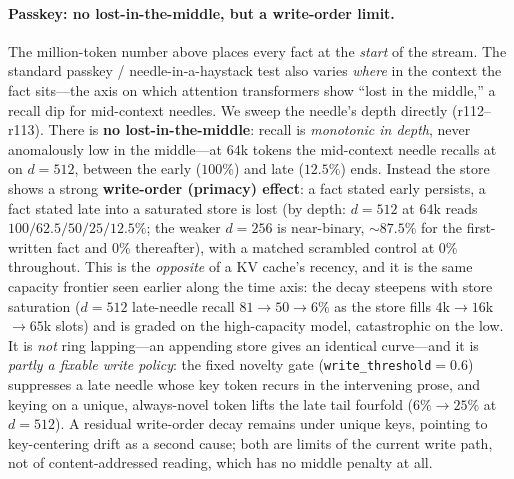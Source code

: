 \paragraph{Passkey: no lost-in-the-middle, but a write-order limit.} The million-token
number above places every fact at the \emph{start} of the stream. The standard passkey /
needle-in-a-haystack test also varies \emph{where} in the context the fact sits---the axis
on which attention transformers show ``lost in the middle,'' a recall dip for
mid-context needles. We sweep the needle's depth directly (r112--r113). There is
\textbf{no lost-in-the-middle}: recall is \emph{monotonic in depth}, never anomalously low
in the middle---at $64$k tokens the mid-context needle recalls at  on
$d{=}512$, between the early ($100\%$) and late ($12.5\%$) ends. Instead the store shows a
strong \textbf{write-order (primacy) effect}: a fact stated early persists, a fact stated
late into a saturated store is lost (by depth: $d{=}512$ at $64$k reads
$100/62.5/50/25/12.5\%$; the weaker $d{=}256$ is near-binary, $\sim\!87.5\%$ for the
first-written fact and $0\%$ thereafter), with a matched scrambled control at $0\%$
throughout. This is the \emph{opposite} of a KV cache's recency, and it is the same
capacity frontier seen earlier along the time axis: the decay
steepens with store saturation ($d{=}512$ late-needle recall $81\!\to\!50\!\to\!6\%$ as the
store fills $4$k$\to$$16$k$\to$$65$k slots) and is graded on the high-capacity model,
catastrophic on the low. It is \emph{not} ring lapping---an appending store gives an
identical curve---and it is \emph{partly a fixable write policy}: the fixed novelty gate
(\texttt{write\_threshold}$=0.6$) suppresses a late needle whose key token recurs in the
intervening prose, and keying on a unique, always-novel token lifts the late tail
fourfold ($6\%\!\to\!25\%$ at $d{=}512$). A residual write-order decay remains under unique
keys, pointing to key-centering drift as a second cause; both are limits of the current
write path, not of content-addressed reading, which has no middle penalty at all.
